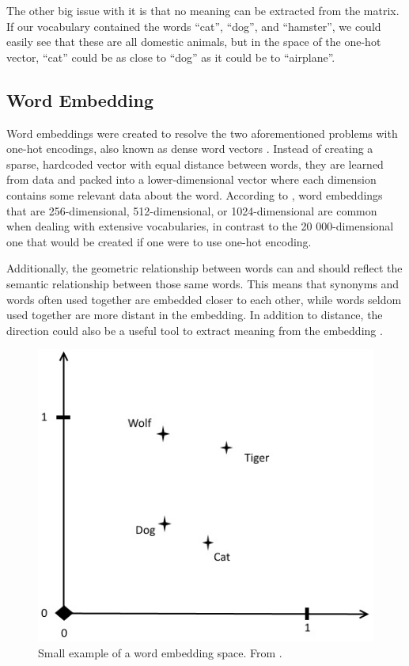 \documentclass[nofilelist]{cslthse-msc}
\begin{document}
The other big issue with it is that no meaning can be extracted from the matrix. If our vocabulary contained the words ``cat'', ``dog'', and ``hamster'', we could easily see that these are all domestic animals, but in the space of the one-hot vector, ``cat'' could be as close to ``dog'' as it could be to ``airplane''. 

\subsection{Word Embedding}
Word embeddings were created to resolve the two aforementioned problems with one-hot encodings, also known as dense word vectors \citep{neuralnetworkmethods}. 
Instead of creating a sparse, hardcoded vector with equal distance between words, they are learned from data and packed into a lower-dimensional vector where each dimension contains some relevant data about the word. According to \citet{franoischollet2017learning}, word embeddings that are 256-dimensional, 512-dimensional, or 1024-dimensional are common when dealing with extensive vocabularies, in contrast to the 20 000-dimensional one that would be created if one were to use one-hot encoding. 

Additionally, the geometric relationship between words can and should reflect the semantic relationship between those same words. This means that synonyms and words often used together are embedded closer to each other, while words seldom used together are more distant in the embedding. In addition to distance, the direction could also be a useful tool to extract meaning from the embedding \citep{whitaker-etal-2019-characterizing}.

\begin{figure}[!ht]
\centering
\includegraphics[scale=0.8]{msccls/explanatory_images/embedding_direction.png} 
\caption{Small example of a word embedding space. From \citet{franoischollet2017learning}.}
\label{fig:direction}
\end{figure}
\end{document}
